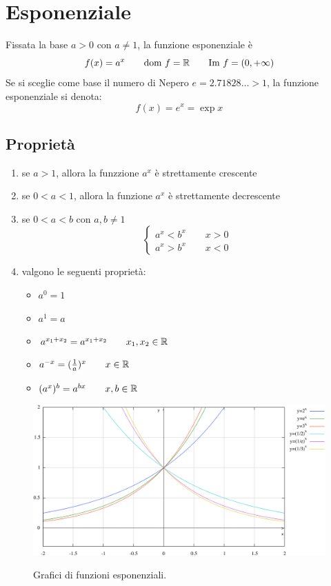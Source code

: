 \section{Esponenziale}
Fissata la base $a>0$ con $a \neq 1$, la funzione esponenziale è
\[f(x)=a^x \qquad \text{dom } f = \mathbb{R} \qquad \text{Im } f = (0,+\infty)\]
Se si sceglie come base il numero di Nepero $e=2.71828\dots > 1$, la funzione esponenziale si denota:
\[f(x)=e^x=\exp x\]

\subsection{Proprietà}
\begin{enumerate}
	\item se $a>1$, allora la funzzione $a^x$ è strettamente crescente
	\item se $0<a<1$, allora la funzione $a^x$ è strettamente decrescente
	\item se $0<a<b$ con $a,b \neq 1$
	\[\begin{cases}
		a^x<b^x \qquad x>0 \\
		a^x > b^x \qquad x<0
	\end{cases}\]
	\item valgono le seguenti proprietà:
	\begin{itemize}
	\item $a^0=1$
	\item $a^1=a$
	\item $a^{x_1+x_2}=a^{x_1+x_2} \qquad x_1,x_2 \in \mathbb{R}$
	\item $a^{-x}=(\frac{1}{a})^x \qquad x \in \mathbb{R}$
	\item $(a^x)^b = a^{bx} \qquad x,b \in \mathbb{R}$
	\end{itemize}
\end{enumerate}

\begin{figure}[H]
{\includegraphics[width=.9\linewidth]{gfx/3/esponenziali.png}}
\caption{Grafici di funzioni esponenziali.}\label{fig:esponenziali}
\end{figure}

